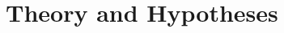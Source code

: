 \documentclass[10pt]{article}
\begin{document}
\section{Theory and Hypotheses}




 
\end{document}
